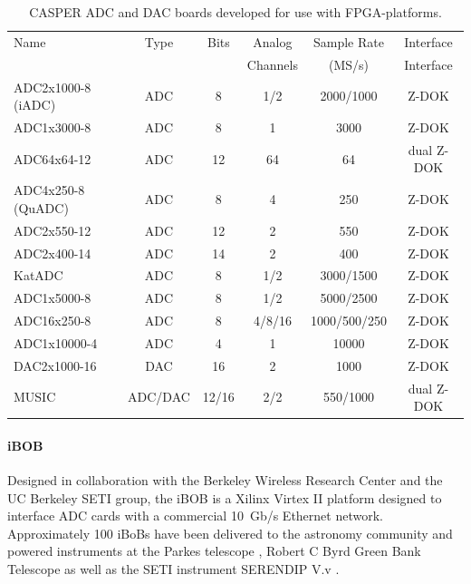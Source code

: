 \documentclass{ws-jai}
\begin{document}
\begin{table}[htb]
\caption{CASPER ADC and DAC boards developed for use with FPGA-platforms.}
\label{table:adc-hardware}
\centering
\begin{tabular}{lccccc}
Name               & Type    & Bits  & Analog   & Sample Rate & Interface \\
                   &         &       & Channels & (MS/s)      & Interface \\
\hline
ADC2x1000-8 (iADC) & ADC     & 8     & 1/2    & 2000/1000    & Z-DOK \\
ADC1x3000-8        & ADC     & 8     & 1      & 3000         & Z-DOK \\
ADC64x64-12        & ADC     & 12    & 64     & 64           & dual Z-DOK \\
ADC4x250-8 (QuADC) & ADC     & 8     & 4      & 250          & Z-DOK \\
ADC2x550-12        & ADC     & 12    & 2      & 550          & Z-DOK \\
ADC2x400-14        & ADC     & 14    & 2      & 400          & Z-DOK \\
KatADC             & ADC     & 8     & 1/2    & 3000/1500    & Z-DOK \\
ADC1x5000-8 \citep{2014PASP..126..761J}       & ADC     & 8     & 1/2    & 5000/2500    & Z-DOK \\
ADC16x250-8 \citep{adc10g}                    & ADC     & 8     & 4/8/16 & 1000/500/250 & Z-DOK \\
ADC1x10000-4       & ADC     & 4     & 1      & 10000        & Z-DOK \\
DAC2x1000-16       & DAC     & 16    & 2      & 1000         & Z-DOK \\
MUSIC              & ADC/DAC & 12/16 & 2/2    & 550/1000     & dual Z-DOK \\
\end{tabular}
\end{table}

\paragraph*{iBOB}
Designed in collaboration with the Berkeley Wireless Research Center and the UC Berkeley SETI group, the iBOB is a Xilinx Virtex II platform designed to interface ADC cards with a commercial 10~Gb/s Ethernet network. Approximately 100 iBoBs have been delivered to the astronomy community \citep{private-mo} and powered instruments at the Parkes telescope \citep{2010MNRAS.409..619K}, Robert C Byrd Green Bank Telescope \citep{guppi} as well as the SETI instrument SERENDIP V.v \citep{seti}.
\end{document}
